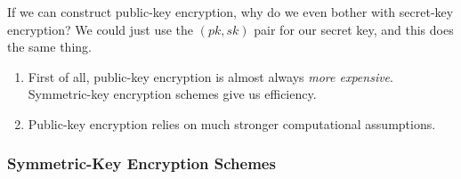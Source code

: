 \begin{ques*}
    If we can construct public-key encryption, why do we even bother with secret-key encryption? We could just use the $(pk, sk)$ pair for our secret key, and this does the same thing.
\end{ques*}

\begin{enumerate}
    \item First of all, public-key encryption is almost always \emph{more expensive}. Symmetric-key encryption schemes give us efficiency.
    \item Public-key encryption relies on much stronger computational assumptions.
\end{enumerate}

\subsubsection{Symmetric-Key Encryption Schemes}
